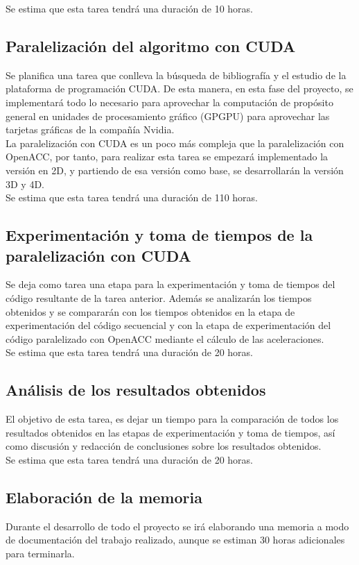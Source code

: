 Se estima que esta tarea tendrá una duración de 10 horas.

\subsection{Paralelización del algoritmo con CUDA}
Se planifica una tarea que conlleva la búsqueda de bibliografía y el estudio de la plataforma de programación CUDA. De esta manera, en esta fase del proyecto, se implementará todo lo necesario para aprovechar la computación de propósito general en unidades de procesamiento gráfico (GPGPU) para aprovechar las tarjetas gráficas de la compañía Nvidia.\\

La paralelización con CUDA es un poco más compleja que la paralelización con OpenACC, por tanto, para realizar esta tarea se empezará implementado la versión en 2D, y partiendo de esa versión como base, se desarrollarán la versión 3D y 4D.\\

Se estima que esta tarea tendrá una duración de 110 horas.

\subsection{Experimentación y toma de tiempos de la paralelización con CUDA}
Se deja como tarea una etapa para la experimentación y toma de tiempos del código resultante de la tarea anterior. Además se analizarán los tiempos obtenidos y se compararán con los tiempos obtenidos en la etapa de experimentación del código secuencial y con la etapa de experimentación del código paralelizado con OpenACC mediante el cálculo de las aceleraciones.\\

Se estima que esta tarea tendrá una duración de 20 horas.

\subsection{Análisis de los resultados obtenidos}
El objetivo de esta tarea, es dejar un tiempo para la comparación de todos los resultados obtenidos en las etapas de experimentación y toma de tiempos, así como discusión y redacción de conclusiones sobre los resultados obtenidos.\\

Se estima que esta tarea tendrá una duración de 20 horas.

\subsection{Elaboración de la memoria}
Durante el desarrollo de todo el proyecto se irá elaborando una memoria a modo de documentación del trabajo realizado, aunque se estiman 30 horas adicionales para terminarla.


